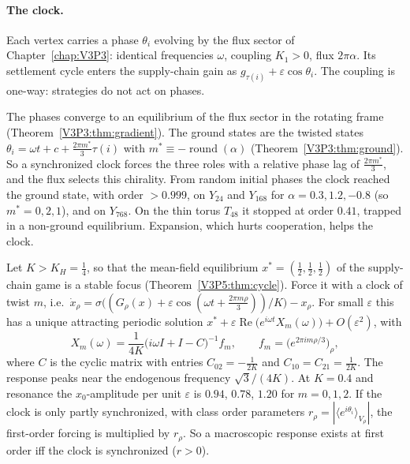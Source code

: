 \paragraph{The clock.} Each vertex carries a phase $\theta_i$ evolving by the flux sector of
Chapter~\ref{chap:V3P3}: identical frequencies $\omega$, coupling $K_1>0$, flux $2\pi\alpha$. Its settlement cycle
enters the supply-chain gain as $g_{\tau(i)}+\varepsilon\cos\theta_i$. The coupling is one-way:
strategies do not act on phases.

\begin{proposition}\label{V3P5:prop:clock}
The phases converge to an equilibrium of the flux sector in the rotating frame
(Theorem~\ref{V3P3:thm:gradient}). The ground states are the twisted states
$\theta_i=\omega t+c+\frac{2\pi m^{*}}3\tau(i)$ with $m^{*}\equiv-\operatorname{round}(\alpha)$
(Theorem~\ref{V3P3:thm:ground}). So a synchronized clock forces the three roles with a relative
phase lag of $\frac{2\pi m^{*}}3$, and the flux selects this chirality. From random initial phases
the clock reached the ground state, with order $>0.999$, on $Y_{24}$ and $Y_{168}$ for
$\alpha=0.3,1.2,-0.8$ (so $m^{*}=0,2,1$), and on $Y_{768}$. On the thin torus $T_{48}$ it stopped at
order $0.41$, trapped in a non-ground equilibrium. Expansion, which hurts cooperation, helps the
clock.
\end{proposition}

\begin{theorem}\label{V3P5:thm:entrain}
Let $K>K_H=\frac14$, so that the mean-field equilibrium $x^{*}=(\frac12,\frac12,\frac12)$ of the
supply-chain game is a stable focus (Theorem~\ref{V3P5:thm:cycle}). Force it with a clock of
twist $m$, i.e.\ $\dot x_\rho=\sigma\bigl((G_\rho(x)+\varepsilon\cos(\omega t+\frac{2\pi
m\rho}3))/K\bigr)-x_\rho$. For small $\varepsilon$ this has a unique attracting periodic solution
$x^{*}+\varepsilon\operatorname{Re}\bigl(e^{i\omega t}X_m(\omega)\bigr)+O(\varepsilon^{2})$, with
\[
X_m(\omega)=\frac1{4K}\bigl(i\omega I+I-C\bigr)^{-1}f_m,\qquad f_m=\bigl(e^{2\pi im\rho/3}\bigr)_\rho,
\]
where $C$ is the cyclic matrix with entries $C_{02}=-\frac1{2K}$ and $C_{10}=C_{21}=\frac1{2K}$. The response peaks near the
endogenous frequency $\sqrt3/(4K)$. At $K=0.4$ and resonance the $x_0$-amplitude per unit
$\varepsilon$ is $0.94$, $0.78$, $1.20$ for $m=0,1,2$. If the clock is only partly synchronized,
with class order parameters $r_\rho=|\langle e^{i\theta_i}\rangle_{V_\rho}|$, the first-order
forcing is multiplied by $r_\rho$. So a macroscopic response exists at first order iff the clock
is synchronized ($r>0$).
\end{theorem}


